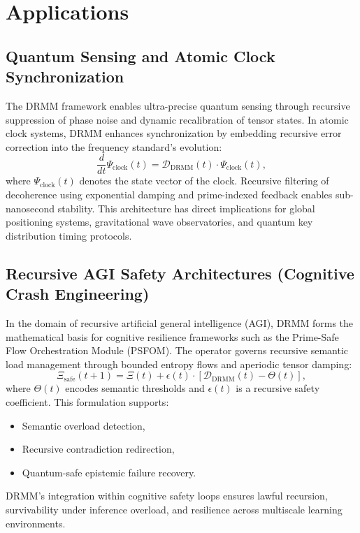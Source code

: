 \documentclass{article}
\theoremstyle{plain}
\begin{document}
\section{Applications}

\subsection{Quantum Sensing and Atomic Clock Synchronization}

The DRMM framework enables ultra-precise quantum sensing through recursive suppression of phase noise and dynamic recalibration of tensor states. In atomic clock systems, DRMM enhances synchronization by embedding recursive error correction into the frequency standard’s evolution:
\begin{equation}
\frac{d}{dt} \Psi_{\text{clock}}(t) = \mathcal{D}_{\text{DRMM}}(t) \cdot \Psi_{\text{clock}}(t),
\end{equation}
where $\Psi_{\text{clock}}(t)$ denotes the state vector of the clock. Recursive filtering of decoherence using exponential damping and prime-indexed feedback enables sub-nanosecond stability. This architecture has direct implications for global positioning systems, gravitational wave observatories, and quantum key distribution timing protocols.

\subsection{Recursive AGI Safety Architectures (Cognitive Crash Engineering)}

In the domain of recursive artificial general intelligence (AGI), DRMM forms the mathematical basis for cognitive resilience frameworks such as the Prime-Safe Flow Orchestration Module (PSFOM). The operator governs recursive semantic load management through bounded entropy flows and aperiodic tensor damping:
\begin{equation}
\Xi_{\text{safe}}(t+1) = \Xi(t) + \epsilon(t) \cdot \left[ \mathcal{D}_{\text{DRMM}}(t) - \Theta(t) \right],
\end{equation}
where $\Theta(t)$ encodes semantic thresholds and $\epsilon(t)$ is a recursive safety coefficient. This formulation supports:
\begin{itemize}
    \item Semantic overload detection,
    \item Recursive contradiction redirection,
    \item Quantum-safe epistemic failure recovery.
\end{itemize}
DRMM’s integration within cognitive safety loops ensures lawful recursion, survivability under inference overload, and resilience across multiscale learning environments.
\end{document}
